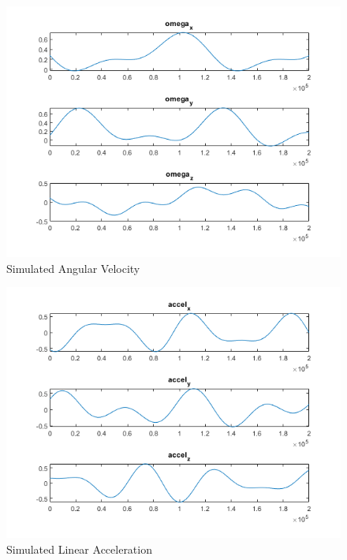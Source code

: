 \documentclass[conference]{IEEEtran}
\begin{document}
\begin{figure}
    \centering
    \includegraphics[width=1.0\linewidth]{figures/simulated_omega.png}
    \caption{Simulated Angular Velocity}
    \label{fig:omega}
\end{figure}
\begin{figure}
    \centering
    \includegraphics[width=1.0\linewidth]{figures/simulated_accel.png}
    \caption{Simulated Linear Acceleration}
    \label{fig:accel}
\end{figure}
\end{document}
